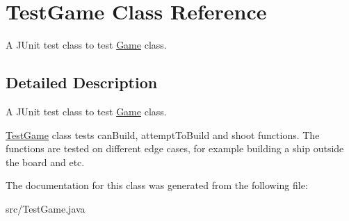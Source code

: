 \hypertarget{classTestGame}{}\section{Test\+Game Class Reference}
\label{classTestGame}


A J\+Unit test class to test \hyperlink{classGame}{Game} class.  




\subsection{Detailed Description}
A J\+Unit test class to test \hyperlink{classGame}{Game} class. 

\hyperlink{classTestGame}{Test\+Game} class tests can\+Build, attempt\+To\+Build and shoot functions. The functions are tested on different edge cases, for example building a ship outside the board and etc. 

The documentation for this class was generated from the following file\+:\begin{DoxyCompactItemize}
\item 
src/Test\+Game.\+java\end{DoxyCompactItemize}
